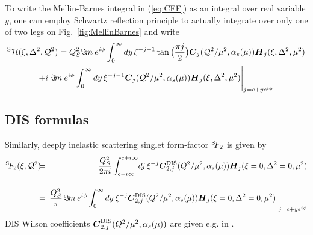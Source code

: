 \documentclass[12pt]{article}
\begin{document}
To write the Mellin-Barnes integral in (\ref{eq:CFF}) as an integral
over real variable $y$, one can employ Schwartz reflection principle to
actually integrate over only one of two legs on Fig.~\ref{fig:MellinBarnes}
and write
\begin{multline}
{^{\rm S}{\cal H}}(\xi,\Delta^2,{\cal Q}^2) = Q_{S}^2
\Im\! m\:  e^{i\phi} 
\int_{0}^{\infty} dy \, \xi^{-j-1}
\tan\big(\frac{\pi j}{2}\big)
\mbox{\boldmath $C$}_{j}({\cal Q}^2/\mu^2,\alpha_s(\mu)) 
\mbox{\boldmath $H$}_{j} (\xi,\Delta^2,\mu^2) \\
+ i\: \Im\! m\:  e^{i\phi} 
\int_{0}^{\infty} dy \, \xi^{-j-1}
\mbox{\boldmath $C$}_{j}({\cal Q}^2/\mu^2,\alpha_s(\mu)) 
\mbox{\boldmath $H$}_{j} (\xi,\Delta^2,\mu^2) 
\Bigg|_{j = c + y e^{i\phi}}
\label{<Hformula>}
\end{multline}

\subsection{DIS formulas}  
\label{ssect:DIS}

Similarly, deeply inelastic scattering singlet form-factor ${^{\rm S}\!{F_2}}$ is given by
\begin{eqnarray}
{^{\rm S}\!{F_2}}(\xi,{\cal Q}^2)
&\!\!\!=\!\!\!& \frac{Q_{S}^2}{2 \pi i}\int_{c-i \infty}^{c+ i \infty}\!
dj\,\xi^{-j}
\mbox{\boldmath $C$}^{\rm DIS}_{2,j}(Q^2/\mu^2,\alpha_s(\mu))
\mbox{\boldmath $H$}_{j} (\xi=0,\Delta^2=0,\mu^2) \nonumber \\[2ex]
&\!\!\!=\!\!\!& \frac{Q_{S}^2}{\pi}\, \Im\! m\: e^{i\phi}
\int_{0}^{\infty} dy\:  \xi^{-j}
\mbox{\boldmath $C$}^{\rm DIS}_{2,j}(Q^2/\mu^2,\alpha_s(\mu))
\mbox{\boldmath $H$}_{j} (\xi=0,\Delta^2=0,\mu^2) 
\Bigg|_{j = c + y e^{i\phi}}
\label{<F2formula>}
\end{eqnarray}
DIS Wilson coefficients $\mbox{\boldmath $C$}^{\rm DIS}_{2,j}(Q^2/\mu^2,\alpha_s(\mu))$
are given e.g. in \cite{vanNeerven:2000uj}.
\end{document}
